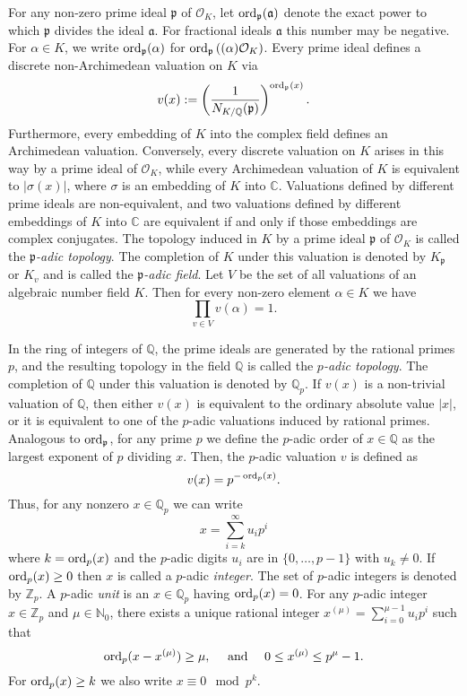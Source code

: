 For any non-zero prime ideal $\mathfrak{p}$ of $\mathcal{O}_K$, let $\operatorname{ord}_{\mathfrak{p}}(\mathfrak{a})$ denote the exact power to which $\mathfrak{p}$ divides the ideal $\mathfrak{a}$. For fractional ideals $\mathfrak{a}$ this number may be negative. For $\alpha \in K$, we write $\operatorname{ord}_{\mathfrak{p}}(\alpha)$ for $\operatorname{ord}_{\mathfrak{p}}\left((\alpha)\mathcal{O}_K\right)$. Every prime ideal defines a discrete non-Archimedean valuation on $K$ via
\[v(x):= \left(\frac{1}{N_{K/\mathbb{Q}}(\mathfrak{p})}\right)^{\operatorname{ord}_{\mathfrak{p}}(x)}.\]
Furthermore, every embedding of $K$ into the complex field defines an Archimedean valuation. Conversely, every discrete valuation on $K$ arises in this way by a prime ideal of $\mathcal{O}_K$, while every Archimedean valuation of $K$ is equivalent to $|\sigma(x)|$, where $\sigma$ is an embedding of $K$ into $\mathbb{C}$. Valuations defined by different prime ideals are non-equivalent, and two valuations defined by different embeddings of $K$ into $\mathbb{C}$ are equivalent if and only if those embeddings are complex conjugates. The topology induced in $K$ by a prime ideal $\mathfrak{p}$ of $\mathcal{O}_K$ is called the \textit{$\mathfrak{p}$-adic topology}. The completion of $K$ under this valuation is denoted by $K_{\mathfrak{p}}$ or $K_v$ and is called the \textit{$\mathfrak{p}$-adic field}. Let $V$ be the set of all valuations of an algebraic number field $K$. Then for every non-zero element $\alpha \in K$ we have 
\[\prod_{v \in V} v(\alpha) = 1.\]

In the ring of integers of $\mathbb{Q}$, the prime ideals are generated by the rational primes $p$, and the resulting topology in the field $\mathbb{Q}$ is called the \textit{$p$-adic topology}. The completion of $\mathbb{Q}$ under this valuation is denoted by $\mathbb{Q}_p$. If $v(x)$ is a non-trivial valuation of $\mathbb{Q}$, then either $v(x)$ is equivalent to the ordinary absolute value $|x|$, or it is equivalent to one of the $p$-adic valuations induced by rational primes. Analogous to $\operatorname{ord}_{\mathfrak{p}}$, for any prime $p$ we define the $p$-adic order of $x \in \mathbb{Q}$ as the largest exponent of $p$ dividing $x$. Then, the $p$-adic valuation $v$ is defined as
\[v(x) = p^{-\operatorname{ord}_p(x)}.\]
Thus, for any nonzero $x \in \mathbb{Q}_p$ we can write
\[x = \sum_{i=k}^{\infty} u_ip^i\]
where $k = \operatorname{ord}_p(x)$ and the $p$-adic digits $u_i$ are in $\{0, \dots, p-1\}$ with $u_k \neq 0$. If $\operatorname{ord}_p(x) \geq 0$ then $x$ is called a $p$-adic \textit{integer}. The set of $p$-adic integers is denoted by $\mathbb{Z}_p$. A $p$-adic \textit{unit} is an $x \in \mathbb{Q}_p$ having $\operatorname{ord}_p(x) = 0$. For any $p$-adic integer $x \in \mathbb{Z}_p$ and $\mu \in \mathbb{N}_0$, there exists a unique rational integer $x^{(\mu)} = \sum_{i=0}^{\mu-1}u_ip^i$ such that 
\[\operatorname{ord}_p(x-x^{(\mu)}) \geq \mu, \quad \text{ and } \quad 0 \leq x^{(\mu)} \leq p^{\mu} - 1.\]
For $\operatorname{ord}_p(x) \geq k$ we also write $x \equiv 0 \mod{p^k}$.

